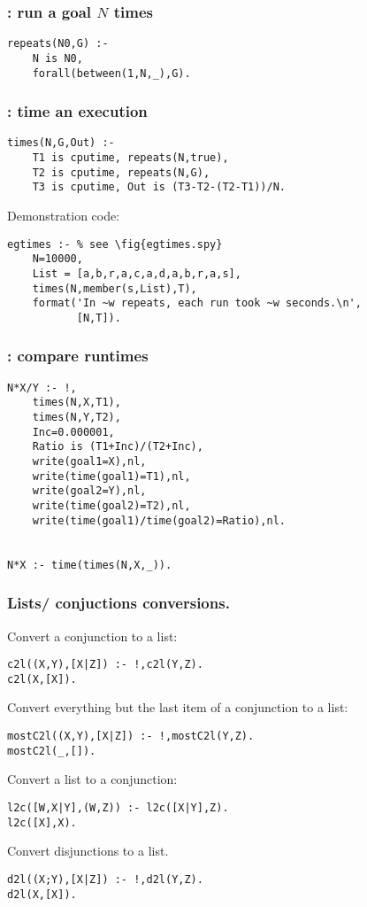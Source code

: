 \subsubsection{ : run a goal $N$ times
}
\begin{Verbatim}
repeats(N0,G) :-
    N is N0,
    forall(between(1,N,_),G).
\end{Verbatim} 
\subsubsection{ : time an execution
}
\label{sec:times/3}
\begin{Verbatim}
times(N,G,Out) :-
    T1 is cputime, repeats(N,true),
    T2 is cputime, repeats(N,G),
    T3 is cputime, Out is (T3-T2-(T2-T1))/N.
\end{Verbatim}   
Demonstration code:
\begin{Verbatim}
egtimes :- % see \fig{egtimes.spy}
    N=10000,
    List = [a,b,r,a,c,a,d,a,b,r,a,s],
    times(N,member(s,List),T),
    format('In ~w repeats, each run took ~w seconds.\n',
           [N,T]).
\end{Verbatim}
\subsubsection{ : compare runtimes
}
\label{sec:2}
\begin{Verbatim}
N*X/Y :- !,  
    times(N,X,T1),
    times(N,Y,T2),
    Inc=0.000001,
    Ratio is (T1+Inc)/(T2+Inc),
    write(goal1=X),nl,
    write(time(goal1)=T1),nl,
    write(goal2=Y),nl,
    write(time(goal2)=T2),nl,
    write(time(goal1)/time(goal2)=Ratio),nl.


N*X :- time(times(N,X,_)).
\end{Verbatim}
\subsubsection{ Lists/ conjuctions conversions.
}
Convert a conjunction to a list:
\begin{Verbatim}
c2l((X,Y),[X|Z]) :- !,c2l(Y,Z).
c2l(X,[X]).
\end{Verbatim}
Convert everything but the last item of a conjunction to a list:
\begin{Verbatim}
mostC2l((X,Y),[X|Z]) :- !,mostC2l(Y,Z).
mostC2l(_,[]).
\end{Verbatim}
Convert a list to a conjunction:
\begin{Verbatim}
l2c([W,X|Y],(W,Z)) :- l2c([X|Y],Z).
l2c([X],X).
\end{Verbatim}
Convert disjunctions to a list.
\begin{Verbatim}
d2l((X;Y),[X|Z]) :- !,d2l(Y,Z).
d2l(X,[X]).
\end{Verbatim}
